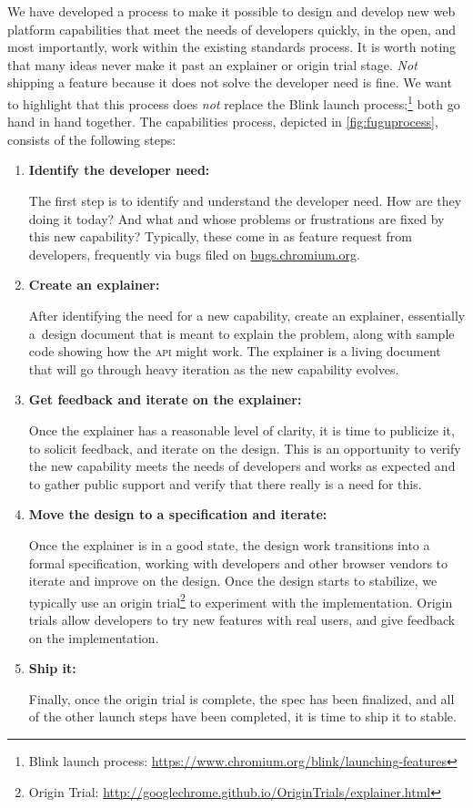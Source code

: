 \documentclass[sigconf]{acmart}
\begin{document}
We have developed a process to make it possible to design and develop
new web platform capabilities that meet the needs of developers quickly,
in the open, and most importantly, work within the existing standards process.
It is worth noting that many ideas never make it past an explainer or origin trial stage.
\textit{Not} shipping a feature because it does not solve the developer need is fine.
We want to highlight that this process does \textit{not} replace the Blink launch
process;\footnote{Blink launch process: \url{https://www.chromium.org/blink/launching-features}}
both go hand in hand together.
The capabilities process, depicted in \autoref{fig:fuguprocess}, consists of the following steps:

\begin{enumerate}  
  \item \textbf{Identify the developer need:}
  
  The first step is to identify and understand the developer need.
  How are they doing it today? And what and whose problems or frustrations
  are fixed by this new capability? Typically, these come in as feature request
  from developers, frequently via bugs filed on \url{bugs.chromium.org}.

  \item \textbf{Create an explainer:}

  After identifying the need for a new capability, create an explainer,
  essentially a~design document that is meant to explain the problem,
  along with sample code showing how the \textsc{api} might work.
  The explainer is a living document that will go through heavy iteration
  as the new capability evolves.

  \item \textbf{Get feedback and iterate on the explainer:}

  Once the explainer has a reasonable level of clarity,
  it is time to publicize it, to solicit feedback, and iterate on the design.
  This is an opportunity to verify the new capability meets the needs of developers
  and works as expected and to gather public support and verify
  that there really is a need for this.

  \item \textbf{Move the design to a specification and iterate:}
  
  Once the explainer is in a good state,
  the design work transitions into a formal specification,
  working with developers and other browser vendors to iterate and improve on the design.
  Once the design starts to stabilize, we typically use an
  origin trial\footnote{Origin Trial: \url{http://googlechrome.github.io/OriginTrials/explainer.html}}
  to experiment with the implementation.
  Origin trials allow developers to try new features with real users,
  and give feedback on the implementation.

  \item \textbf{Ship it:}

  Finally, once the origin trial is complete, the spec has been finalized,
  and all of the other launch steps have been completed, it is time to ship it to stable.  
\end{enumerate}
\end{document}
